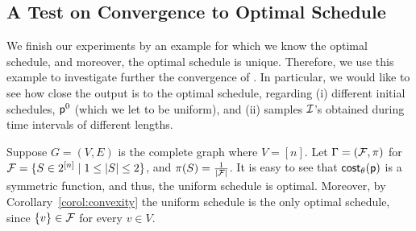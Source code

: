 % 
% 


\subsection{A Test on Convergence to  Optimal Schedule}
We finish our experiments by an example for which we know the optimal schedule, and moreover, the optimal schedule is unique. Therefore, we use this example to investigate further the convergence of \algonameapx. In particular, we would like to see how close the \algonameapx output is to the optimal schedule, regarding (i) different initial schedules, $\mathsf{p}^0$ (which we let to be uniform), and (ii) samples $\mathcal{I}$'s  obtained during time intervals of different lengths.

Suppose $G=(V,E)$ is the complete graph where $V=[n]$. Let $\Gamma=(\mathcal{F}, \pi)$ for  $\mathcal{F} = \{S \in 2^{[n]} \mid 1 \leq|S| \leq 2\}$, and $\pi(S)=\frac{1}{|\mathcal{F}|}$. It is easy to see that $\mathsf{cost}_\theta(\mathsf{p})$ is a symmetric function, and thus, the uniform schedule is optimal. Moreover, by Corollary~\ref{corol:convexity} the uniform schedule is the only optimal schedule, since $\{v\} \in \mathcal{F}$ for every $v\in V$.

